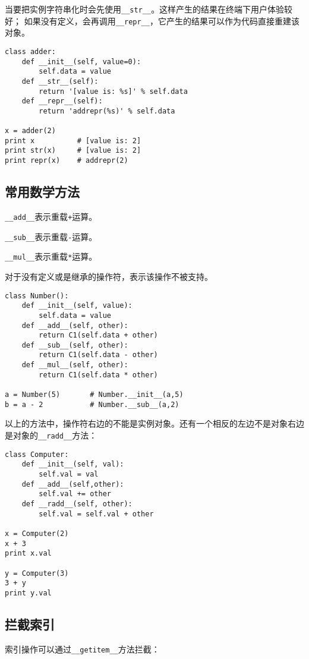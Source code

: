 当要把实例字符串化时会先使用\verb|__str__|。这样产生的结果在终端下用户体验较好； 如果没有定义，会再调用\verb|__repr__|，它产生的结果可以作为代码直接重建该对象。

\begin{lstlisting}
class adder:
	def __init__(self, value=0):
		self.data = value
	def __str__(self):
		return '[value is: %s]' % self.data
	def __repr__(self):
		return 'addrepr(%s)' % self.data

x = adder(2)
print x          # [value is: 2]
print str(x)     # [value is: 2]
print repr(x)    # addrepr(2)
\end{lstlisting}

\subsection{常用数学方法}

\verb|__add__|表示重载\verb|+|运算。

\verb|__sub__|表示重载\verb|-|运算。

\verb|__mul__|表示重载\verb|*|运算。

对于没有定义或是继承的操作符，表示该操作不被支持。

\begin{lstlisting}
class Number():
	def __init__(self, value):
		self.data = value
	def __add__(self, other):
		return C1(self.data + other)
	def __sub__(self, other):
		return C1(self.data - other)
	def __mul__(self, other):
		return C1(self.data * other)

a = Number(5)       # Number.__init__(a,5)
b = a - 2           # Number.__sub__(a,2)
\end{lstlisting}

以上的方法中，操作符右边的不能是实例对象。还有一个相反的左边不是对象右边是对象的\verb|__radd__|方法：

\begin{lstlisting}
class Computer:
	def __init__(self, val):
		self.val = val
	def __add__(self,other):
		self.val += other
	def __radd__(self, other):
		self.val = self.val + other

x = Computer(2)
x + 3
print x.val

y = Computer(3)
3 + y
print y.val
\end{lstlisting}

\subsection{拦截索引}

索引操作可以通过\verb|__getitem__|方法拦截：

